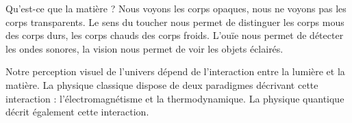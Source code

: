 Qu'est-ce que la matière ? Nous voyons les corps opaques, nous ne voyons pas les corps transparents. Le sens du toucher nous permet de distinguer les corps mous des corps durs, les corps chauds des corps froids. L'ouïe nous permet de détecter les ondes sonores, la vision nous permet de voir les objets éclairés.

Notre perception visuel de l'univers dépend de l'interaction entre la lumière et la matière.
La physique classique dispose de deux paradigmes décrivant cette interaction : l'électromagnétisme et la thermodynamique.
La physique quantique décrit également cette interaction.






